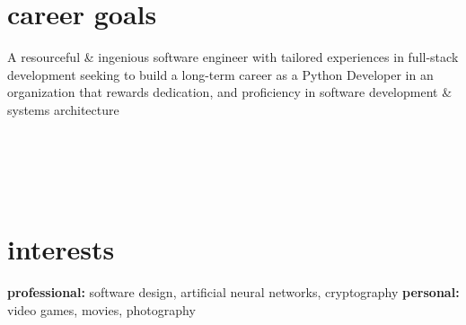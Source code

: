 \documentclass[]{exponential-cv}
\begin{document}
\section{career goals}
A resourceful \& ingenious software engineer with tailored experiences in full-stack development seeking to build a long-term career as a Python Developer in an organization that rewards dedication, and proficiency in software development \& systems architecture



\ \\


\newpage



\ \\


\ \\
\section{interests}
\textbf{professional:} software design, artificial neural networks, cryptography
\newline
\textbf{personal:} video games, movies, photography
\end{document}

